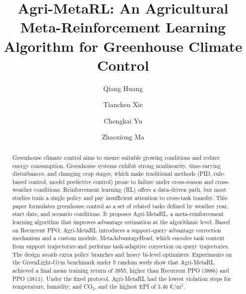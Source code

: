 \documentclass[number,preprint,review,12pt]{elsarticle}
\begin{document}
\begin{frontmatter}

\title{Agri-MetaRL: An Agricultural Meta-Reinforcement Learning Algorithm for Greenhouse Climate Control}

\author[inst1]{Qiang Huang\footnotemark[1]}

\author[inst1]{Tianchen Xie\footnotemark[1]}

\author[inst1]{Chengkai Yu}

\author[inst1]{Zhaoxiong Ma}



\begin{abstract}
Greenhouse climate control aims to ensure suitable growing conditions and reduce energy consumption. Greenhouse systems exhibit strong nonlinearity, time-varying disturbances, and changing crop stages, which make traditional methods (PID, rule-based control, model predictive control) prone to failure under cross-season and cross-weather conditions. Reinforcement learning (RL) offers a data-driven path, but most studies train a single policy and pay insufficient attention to cross-task transfer. This paper formulates greenhouse control as a set of related tasks defined by weather year, start date, and scenario conditions. It proposes Agri-MetaRL, a meta-reinforcement learning algorithm that improves advantage estimation at the algorithmic level. Based on Recurrent PPO, Agri-MetaRL introduces a support-query advantage correction mechanism and a custom module, MetaAdvantageHead, which encodes task context from support trajectories and performs task-adaptive correction on query trajectories. The design avoids extra policy branches and heavy bi-level optimizers. Experiments on the GreenLight-Gym benchmark under 5 random seeds show that Agri-MetaRL achieved a final mean training return of 3955, higher than Recurrent PPO (3886) and PPO (3811). Under the fixed protocol, Agri-MetaRL had the lowest violation steps for temperature, humidity, and CO$_2$, and the highest EPI of 3.46 €/m$^2$.
\end{abstract}


\end{frontmatter}
\end{document}
